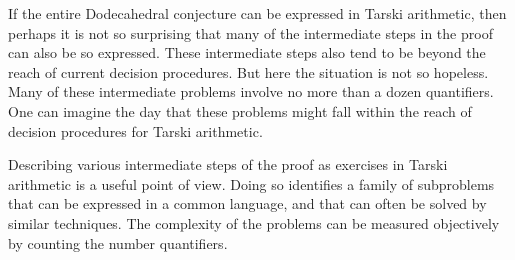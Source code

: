 \documentclass{article} %
\begin{document}
If the entire Dodecahedral conjecture can be expressed
in Tarski arithmetic, then perhaps it is not so surprising that
many of the intermediate steps in the proof can also be so expressed.
These intermediate steps also tend to be beyond the reach of
current decision procedures.  
But here the situation is not so hopeless.  Many of these
intermediate problems involve no more than a dozen quantifiers.
One can imagine the day that these problems might fall within the
reach of decision procedures for Tarski arithmetic.

Describing various intermediate steps 
of the proof as exercises
in Tarski arithmetic is a useful point of view.  Doing so identifies
a family of subproblems that can be expressed in a common language,
and that can often be solved by similar techniques.  
The complexity of the
problems can be measured objectively by counting the number
quantifiers.
\end{document}
